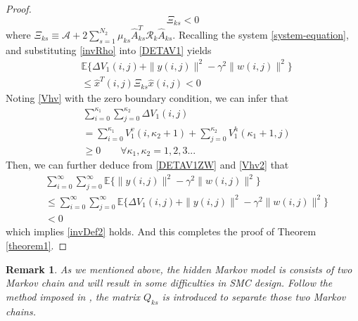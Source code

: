 \documentclass[conference]{IEEEtran}
\newtheorem{remark}{Remark}
\begin{document}
\begin{proof}
	\begin{equation}\label{T1P4}
	\mathcal{\varXi}_{ks}<0
	\end{equation}	
	where $\mathcal{\varXi}_{ks} \equiv \mathcal{A} +2\sum_{s=1}^{N_{2}}\mu_{ks}\hat{A}^{T}_{ks}\mathcal{R}_{k}\hat{A}_{ks}$. 
	Recalling the system \eqref{system-equation}, and substituting \eqref{invRho} into \eqref{DETAV1} yields
	\begin{equation}\label{DETAV1ZW}
		\begin{split}
			&\mathbb{E}\{\varDelta V_{1}(i,j)+\|y(i,j)\|^{2}-\gamma^{2}\|w(i,j)\|^{2}  \}\\
			&\leq \hat{x}^{T}(i,j)\mathcal{\varXi}_{ks} \hat{x}(i,j)<0
		\end{split}
	\end{equation}
	Noting \eqref{Vhv} with the zero boundary condition, we can infer that
	\begin{equation} \label{Vhv2}
	\begin{split}
	&\sum_{i=0}^{\kappa_{1}}\sum_{j=0}^{\kappa_{2}}  \varDelta V_{1}(i,j)\\
	&=\sum_{i=0}^{\kappa_{1}}V^{v}_{1}(i,\kappa_{2}+1) + \sum_{j=0}^{\kappa_{2}}V^{h}_{1}(\kappa_{1}+1,j) \\
	&\geq 0 \qquad \forall \kappa_{1},\kappa_{2} = 1,2,3...
	\end{split}
	\end{equation}
	Then, we can further deduce from \eqref{DETAV1ZW} and \eqref{Vhv2} that 
	\begin{equation}\label{DETAV1ZW2}
	\begin{split}
	&\sum_{i=0}^{\infty}\sum_{j=0}^{\infty}  \mathbb{E}\{\|y(i,j)\|^{2}-\gamma^{2}\|w(i,j)\|^{2}  \}\\
	&\leq \sum_{i=0}^{\infty}\sum_{j=0}^{\infty}  \mathbb{E}\{\varDelta V_{1}(i,j)+\|y(i,j)\|^{2}-\gamma^{2}\|w(i,j)\|^{2}  \}  \\
	&< 0
	\end{split}
	\end{equation}
	which implies \eqref{invDef2} holds. And this completes the proof of Theorem \ref{theorem1}.
	
	
\end{proof}


\begin{remark}
	As we mentioned above, the hidden Markov model is consists of two Markov chain and will result in some difficulties in SMC design. Follow the method imposed in \cite{passive_wu}, the matrix $Q_{ks}$ is introduced to separate those two Markov chains.
\end{remark}
\end{document}

